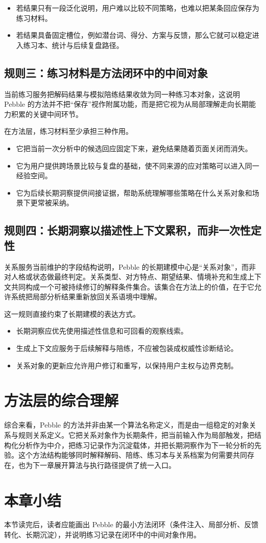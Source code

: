 \begin{itemize}
  \item 若结果只有一段泛化说明，用户难以比较不同策略，也难以把某条回应保存为练习材料。
  \item 若结果具备固定槽位，例如潜台词、得分、方案与反馈，那么它就可以稳定进入练习本、统计与后续复盘路径。
\end{itemize}

\subsection{规则三：练习材料是方法闭环中的中间对象}

当前练习服务把解码结果与模拟陪练结果收敛为同一种练习本对象，这说明 Pebble 的方法并不把“保存”视作附属功能，而是把它视为从局部理解走向长期能力积累的关键中间环节。

在方法层，练习材料至少承担三种作用。

\begin{itemize}
  \item 它把当前一次分析中的候选回应固定下来，避免结果随着页面关闭而消失。
  \item 它为用户提供跨场景比较与复盘的基础，使不同来源的应对策略可以进入同一经验空间。
  \item 它为后续长期洞察提供间接证据，帮助系统理解哪些策略在什么关系对象和场景下更常被采纳。
\end{itemize}

\subsection{规则四：长期洞察以描述性上下文累积，而非一次性定性}

关系服务当前维护的字段结构说明，Pebble 的长期建模中心是“关系对象”，而非对人格或状态做最终判定。关系类型、对方特点、期望结果、情境补充和生成上下文共同构成一个可被持续修订的解释条件集合。该集合在方法上的价值，在于它允许系统把局部分析结果重新放回关系语境中理解。

这一规则直接约束了长期建模的表达方式。

\begin{itemize}
  \item 长期洞察应优先使用描述性信息和可回看的观察线索。
  \item 生成上下文应服务于后续解释与陪练，不应被包装成权威性诊断结论。
  \item 关系对象的更新应允许用户修订和重写，以保持用户主权与边界克制。
\end{itemize}

\section{方法层的综合理解}

综合来看，Pebble 的方法并非由某一个算法名称定义，而是由一组稳定的对象关系与规则关系定义。它把关系对象作为长期条件，把当前输入作为局部触发，把结构化分析作为中介，把练习记录作为沉淀载体，并把长期洞察作为下一轮分析的先验。这个方法结构能够同时解释解码、陪练、练习本与关系档案为何需要共同存在，也为下一章展开算法与执行路径提供了统一入口。

\section{本章小结}

本节读完后，读者应能画出 Pebble 的最小方法闭环（条件注入、局部分析、反馈转化、长期沉淀），并说明练习记录在闭环中的中间对象作用。
